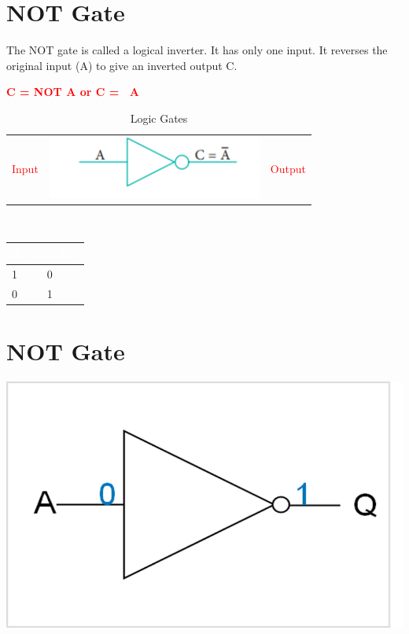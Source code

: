 \documentclass{article}
\begin{document}
\section{NOT Gate}
The NOT gate is called a logical inverter.
It has only one input. It reverses the original input (A) to give an inverted output C.
\\
\begin{center}
	\textcolor{red}{\textbf{C = NOT A or C = ~A}}
\end{center}
\begin{table}[h!]
	\begin{center}
		\caption{Logic Gates}
		\label{tab:table1}
		\begin{tabular}{l c c}
			\textcolor{red}{Input}
			&
			\includegraphics[width=0.25\linewidth]{Logicpic3}
			&
			\textcolor{red}{Output}
			\\
		\end{tabular}
	\end{center}
\end{table}
\\
\begin{table}[h!]
	\label{tab:table1}
	\begin{center}
		\begin{tabular}{ |l|c|c| }
			\cellcolor{blue!100}\textcolor{white}{\textbf{    A    }} & \cellcolor{blue!100}\textcolor{white}{\textbf{C=~A}}\\
			\hline
			1 & 0\\
			0 & 1\\
			\hline
			
		\end{tabular}
	\end{center}
\end{table}
\newpage
\section{NOT Gate}
\begin{center}
	\includegraphics[width=1.2\linewidth]{Not}
\end{center}
\end{document}
